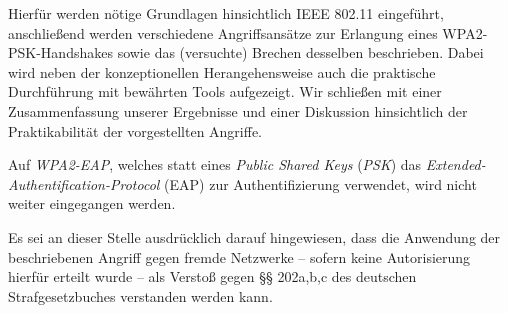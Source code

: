 Hierfür werden nötige Grundlagen hinsichtlich IEEE 802.11 eingeführt, anschließend werden verschiedene Angriffsansätze zur Erlangung eines WPA2-PSK-Handshakes sowie das (versuchte) Brechen desselben beschrieben. 
Dabei wird neben der konzeptionellen Herangehensweise auch die praktische Durchführung mit bewährten Tools aufgezeigt. 
Wir schließen mit einer Zusammenfassung unserer Ergebnisse und einer Diskussion hinsichtlich der Praktikabilität der vorgestellten Angriffe.

Auf \textit{WPA2-EAP}, welches statt eines \textit{Public Shared Keys} (\textit{PSK}) das \textit{Extended-Authentification-Protocol} (EAP) zur Authentifizierung verwendet, wird nicht weiter eingegangen werden.

Es sei an dieser Stelle ausdrücklich darauf hingewiesen, dass die Anwendung der beschriebenen Angriff gegen fremde Netzwerke -- sofern keine Autorisierung hierfür erteilt wurde -- als Verstoß gegen §§ 202a,b,c des deutschen Strafgesetzbuches verstanden werden kann.
